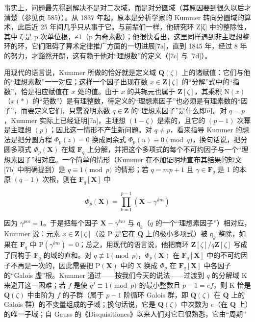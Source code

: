 事实上，问题最先得到解决不是对二次域，而是对分圆域（其原因要到很久以后才清楚（参见页 585））。从 1837 年起，原本是分析学家的 Kummer 转向分圆域的算术，此后近 25 年间几乎只从事于它。与前辈们一样，他研究环 Z{[}ζ{]} 中的整除性，其中 ζ 是 p 次单位根，≠1（p 为奇素数）；他很快看出，这里同样遇到非主理想整环的环，它们阻碍了算术定律推广方面的一切进展{[}7a{]}，直到 1845 年，经过 8 年的努力，才豁然开朗，这有赖于他对“理想数”的定义（{[}7c{]} 与 {[}7d{]}）。

用现代的语言说，Kummer 所做的恰好就是定义域 \(\mathbf{Q}(\zeta)\) 上的诸赋值：它们与他的“理想素数”一一对应；这样一个因子出现在数 \(x \in \mathbf{Z}[\zeta]\) 的“分解”式中的“指数”，恰是相应赋值在 \(x\) 处的值。由于 \(x\) 的共轭元也属于 \(\mathbf{Z}[\zeta]\)，其乘积 \(\mathrm{N}(x)\)（\(x(*)\) 的“范数”）是有理整数，待定义的“理想素因子”也必须是有理素数的“因子”，而要定义它们，只需说明素数 \(q \in \mathbf{Z}\) 的“理想素因子”是什么即可。对 \(q = p\)，Kummer 实际上已经证明{[}7a{]}，主理想 \((1 - \zeta)\) 是素的，且它的 \((p - 1)\) 次幂是主理想 \((p)\)；因此这一情形不产生新问题。对 \(q \neq p\)，看来指导 Kummer 的想法是把分圆方程 \(\Phi_p(z) = 0\) 换成同余式 \(\Phi_p(u) \equiv 0 \pmod{q}\)，换句话说，把分圆多项式 \(\Phi_p(\mathbf{X})\) 在域 \(\mathbf{F}_q\) 上分解，并把这个多项式的每个不可约因子与一个“理想素因子”相对应。一个简单的情形（Kummer 在不加证明地宣布其结果的短文 {[}7b{]} 中明确提到）是 \(q \equiv 1 \pmod{p}\) 的情形；若 \(q = mp + 1\) 且 \(\gamma \in \mathbf{F}_q\) 是 1 的本原 \((q - 1)\) 次根，则在 \(\mathbf{F}_q[\mathbf{X}]\) 中

\[
\Phi_ {p} (\mathbf {X}) = \prod_ {k = 1} ^ {p - 1} \left(\mathbf {X} - \gamma^ {k m}\right)
\]

因为 \(\gamma^{pm} = 1\)。于是把每个因子 \(\mathbf{X} - \gamma^{km}\) 与 \(\mathfrak{q}_k\)（\(q\) 的一个“理想素因子”）相对应，Kummer 说：元素 \(x \in \mathbf{Z}[\zeta]\)（设 P 是它在 \(\mathbf{Q}\) 上的极小多项式）被 \(\mathfrak{q}_k\) 整除，如果在 \(\mathbf{F}_q\) 中 \(\mathrm{P}(\gamma^{km}) = 0\)；总之，用现代的语言说，他把商环 \(\mathbf{Z}[\zeta]/q\mathbf{Z}[\zeta]\) 写成了同构于 \(\mathbf{F}_q\) 的域的直和。对 \(q \not\equiv 1 \pmod{p}\)，\(\Phi_p(\mathbf{X})\) 在 \(\mathbf{F}_q[\mathbf{X}]\) 中的不可约因子不再是一次的，因此需要把 \(\mathrm{P}(\mathbf{X})\) 中的 X 换成 \(\Phi_p\) 在 \(\mathbf{F}_q[\mathbf{X}]\) 中各因子的“Galois 虚”根。Kummer 通过——按我们今天的说法——过渡到 \(q\) 的分解域 K 来避开这一困难；若 \(f\) 是使 \(q^f \equiv 1 \pmod{p}\) 的最小整数且 \(p - 1 = ef\)，则 K 恰是 \(\mathbf{Q}(\zeta)\) 中由阶为 \(f\) 的子群（属于 \(p - 1\) 阶循环 Galois 群，即 \(\mathbf{Q}(\zeta)\) 在 \(\mathbf{Q}\) 上的 Galois 群）的不变量组成的子域；换句话说，它是 \(\mathbf{Q}(\zeta)\) 中次数为 \(e\)（在 \(\mathbf{Q}\) 上）的唯一子域；自 Gauss 的《Disquisitiones》以来人们对它已很熟悉，它由“周期”

